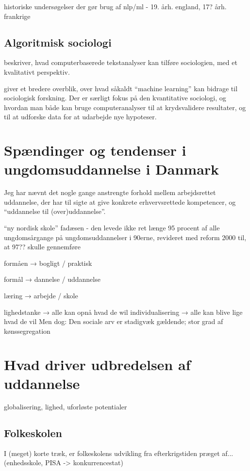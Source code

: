 historiske undersøgelser der gør brug af nlp/ml - 19. årh. england, 17? årh. frankrige

\subsection{Algoritmisk sociologi}\label{sec:review-compsoc}

\cite{evansMachineTranslationMining2016} beskriver, hvad computerbaserede tekstanalyser kan tilføre sociologien, med et kvalitativt perspektiv. 

 \cite{molinaMachineLearningSociology2019} giver et bredere overblik, over hvad såkaldt “machine learning” kan bidrage til sociologisk forskning.
Der er særligt fokus på den kvantitative sociologi, og hvordan man både kan bruge computeranalyser til at krydsvalidere resultater, og til at udforske data for at udarbejde nye hypoteser.

\section{Spændinger og tendenser i ungdomsuddannelse i Danmark}

Jeg har nævnt det nogle gange anstrengte forhold mellem arbejdsrettet uddannelse, der har til sigte at give konkrete erhvervsrettede kompetencer, og “uddannelse til (over)uddannelse”.

“ny nordisk skole” fadæsen - den levede ikke ret længe
95 procent af alle ungdomsårgange på ungdomsuddannelser i 90erne, revideret med reform 2000 til, at 97?? skulle gennemføre

formåen → bogligt / praktisk

formål → dannelse / uddannelse

læring → arbejde / skole

lighedstanke  → alle kan opnå hvad de wil
individualisering → alle kan blive lige hvad de vil
Men dog: Den sociale arv er stadigvæk gældende; stor grad af kønssegregation


\section{Hvad driver udbredelsen af uddannelse}


globalisering, lighed, uforløste potentialer

\subsection{Folkeskolen}
I (meget) korte træk, er folkeskolens udvikling fra efterkrigstiden præget af... (enhedsskole, PISA -> konkurrencestat)


